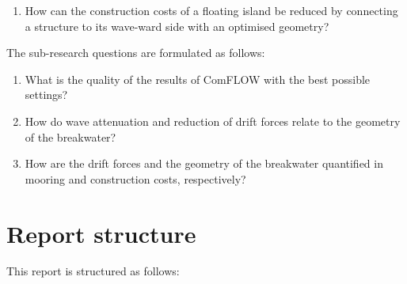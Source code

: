 \begin{enumerate}
    \item How can the construction costs of a floating island be reduced by connecting a structure to its wave-ward side with an optimised geometry?
\end{enumerate}


The sub-research questions are formulated as follows:
\begin{enumerate}[resume]
    \item What is the quality of the results of ComFLOW with the best possible settings?
    \item How do wave attenuation and reduction of drift forces relate to the geometry of the breakwater?
    \item How are the drift forces and the geometry of the breakwater quantified in mooring and construction costs, respectively?
\end{enumerate}












\section{Report structure}
This report is structured as follows:


